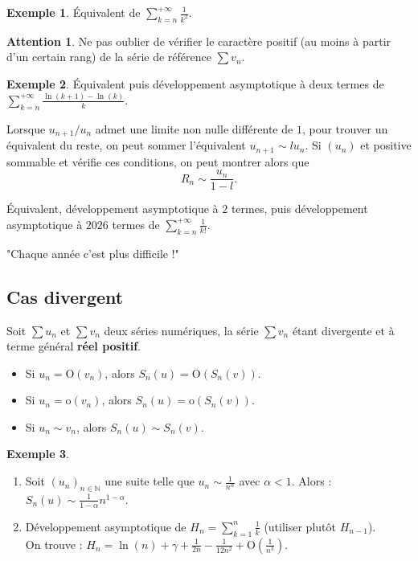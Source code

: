 \documentclass[french]{article}
\newcommand{\N}{\mathbb{N}}
\renewcommand{\o}{\text{o}}
\renewcommand{\O}{\text{O}}
\theoremstyle{plain}
\theoremstyle{definition}
\newtheorem*{ex}{Exemple}
\newtheorem*{attention}{Attention}
\theoremstyle{remark}
\begin{document}
\begin{ex}
	Équivalent de $\displaystyle\sum_{k=n}^{+\infty}\frac{1}{k^2}$.
\end{ex}

\begin{attention}
	Ne pas oublier de vérifier le caractère positif (au moins à partir d'un certain rang) de la série de référence $\displaystyle\sum v_n$.
\end{attention}

\begin{ex}
	Équivalent puis développement asymptotique à deux termes de $\displaystyle\sum_{k=n}^{+\infty}\frac{\ln(k+1)-\ln(k)}{k}$.
\end{ex}

\begin{met}
	Lorsque $u_{n+1}/u_n$ admet une limite non nulle différente de $1$, pour trouver un équivalent du reste, on peut sommer l'équivalent $u_{n+1}\sim lu_n$. Si $(u_n)$ et positive sommable et vérifie ces conditions, on peut montrer alors que $$R_n\sim\frac{u_n}{1-l}.$$
\end{met}

\begin{exo}
	Équivalent, développement asymptotique à $2$ termes, puis développement asymptotique à $2026$ termes de $\displaystyle\sum_{k=n}^{+\infty}\frac{1}{k!}$.
\end{exo}

"Chaque année c'est plus difficile !"

\subsection{Cas divergent}

\begin{thm}
	Soit $\displaystyle\sum u_n$ et $\displaystyle\sum v_n$ deux séries numériques, la série $\displaystyle \sum v_n$ étant divergente et à terme général \textbf{réel positif}.
	\begin{itemize}
		\item Si $u_n=\O(v_n)$, alors $S_n(u)=\O(S_n(v))$.
		\item Si $u_n=\o(v_n)$, alors $S_n(u)=\o(S_n(v))$.
		\item Si $u_n\sim v_n$, alors $S_n(u)\sim S_n(v)$.
	\end{itemize}
\end{thm}

\begin{ex}
	\begin{enumerate}
		\item Soit $(u_n)_{n\in\N}$ une suite telle que $u_n\sim\displaystyle\frac{1}{n^\alpha}$ avec $\alpha<1$. Alors : $S_n(u)\sim\displaystyle\frac{1}{1-\alpha}n^{1-\alpha}$.
		\item Développement asymptotique de $H_n=\displaystyle\sum_{k=1}^{n}\frac{1}{k}$ (utiliser plutôt $H_{n-1}$). \\
		On trouve : $H_n=\displaystyle\ln(n)+\gamma+\frac{1}{2n}-\frac{1}{12n^2}+\O\left(\frac{1}{n^3}\right)$.
	\end{enumerate}
\end{ex}
\end{document}
